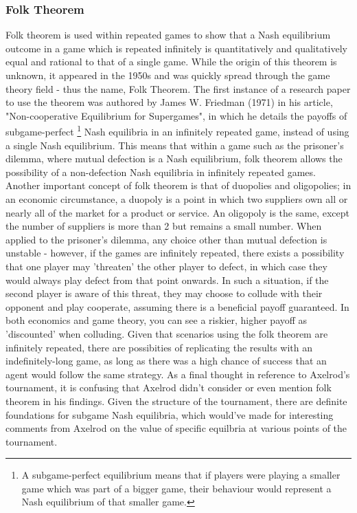 \documentclass[12pt,a4paper]{article}
\begin{document}
\subsubsection{Folk Theorem}
Folk theorem is used within repeated games to show that a Nash equilibrium outcome in a game which is repeated infinitely is quantitatively and qualitatively equal and rational to that of a single game. While the origin of this theorem is unknown, it appeared in the 1950s and was quickly spread through the game theory field - thus the name, Folk Theorem. The first instance of a research paper to use the theorem was authored by James W. Friedman (1971) in his article, "Non-cooperative Equilibrium for Supergames", in which he details the payoffs of subgame-perfect \footnote{A subgame-perfect equilibrium means that if players were playing a smaller game which was part of a bigger game, their behaviour would represent a Nash equilibrium of that smaller game.} Nash equilibria in an infinitely repeated game, instead of using a single Nash equilibrium. This means that within a game such as the prisoner's dilemma, where mutual defection is a Nash equilibrium, folk theorem allows the possibility of a non-defection Nash equilibria in infinitely repeated games. Another important concept of folk theorem is that of duopolies and oligopolies; in an economic circumstance, a duopoly is a point in which two suppliers own all or nearly all of the market for a product or service. An oligopoly is the same, except the number of suppliers is more than 2 but remains a small number. When applied to the prisoner's dilemma, any choice other than mutual defection is unstable - however, if the games are infinitely repeated, there exists a possibility that one player may 'threaten' the other player to defect, in which case they would always play defect from that point onwards. In such a situation, if the second player is aware of this threat, they may choose to collude with their opponent and play cooperate, assuming there is a beneficial payoff guaranteed. In both economics and game theory, you can see a riskier, higher payoff as 'discounted' when colluding. Given that scenarios using the folk theorem are infinitely repeated, there are possibities of replicating the results with an indefinitely-long game, as long as there was a high chance of success that an agent would follow the same strategy. As a final thought in reference to Axelrod's tournament, it is confusing that Axelrod didn't consider or even mention folk theorem in his findings. Given the structure of the tournament, there are definite foundations for subgame Nash equilibria, which would've made for interesting comments from Axelrod on the value of specific equilbria at various points of the tournament. \\
\end{document}
